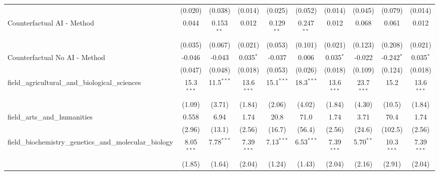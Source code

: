 \begin{tabular}{lccccccccc}
                                                               & (0.020)       & (0.038)       & (0.014)       & (0.025)      & (0.052)      & (0.014)       & (0.045)        & (0.079)        & (0.014)\\   
   Counterfactual AI - Method                                  & 0.044         & 0.153$^{**}$  & 0.012         & 0.129$^{**}$ & 0.247$^{**}$ & 0.012         & 0.068          & 0.061          & 0.012\\   
                                                               & (0.035)       & (0.067)       & (0.021)       & (0.053)      & (0.101)      & (0.021)       & (0.123)        & (0.208)        & (0.021)\\   
   Counterfactual No AI - Method                               & -0.046        & -0.043        & 0.035$^{*}$   & -0.037       & 0.006        & 0.035$^{*}$   & -0.022         & -0.242$^{*}$   & 0.035$^{*}$\\   
                                                               & (0.047)       & (0.048)       & (0.018)       & (0.053)      & (0.026)      & (0.018)       & (0.109)        & (0.124)        & (0.018)\\   
   field\_agricultural\_and\_biological\_sciences              & 15.3$^{***}$  & 11.5$^{***}$  & 13.6$^{***}$  & 15.1$^{***}$ & 18.3$^{***}$ & 13.6$^{***}$  & 23.7$^{***}$   & 15.2           & 13.6$^{***}$\\   
                                                               & (1.09)        & (3.71)        & (1.84)        & (2.06)       & (4.02)       & (1.84)        & (4.30)         & (10.5)         & (1.84)\\   
   field\_arts\_and\_humanities                                & 0.558         & 6.94          & 1.74          & 20.8         & 71.0         & 1.74          & 3.71           & 70.4           & 1.74\\   
                                                               & (2.96)        & (13.1)        & (2.56)        & (16.7)       & (56.4)       & (2.56)        & (24.6)         & (102.5)        & (2.56)\\   
   field\_biochemistry\_genetics\_and\_molecular\_biology      & 8.05$^{***}$  & 7.78$^{***}$  & 7.39$^{***}$  & 7.13$^{***}$ & 6.53$^{***}$ & 7.39$^{***}$  & 5.70$^{**}$    & 10.3$^{***}$   & 7.39$^{***}$\\   
                                                               & (1.85)        & (1.64)        & (2.04)        & (1.24)       & (1.43)       & (2.04)        & (2.16)         & (2.91)         & (2.04)\\   

\end{tabular}
